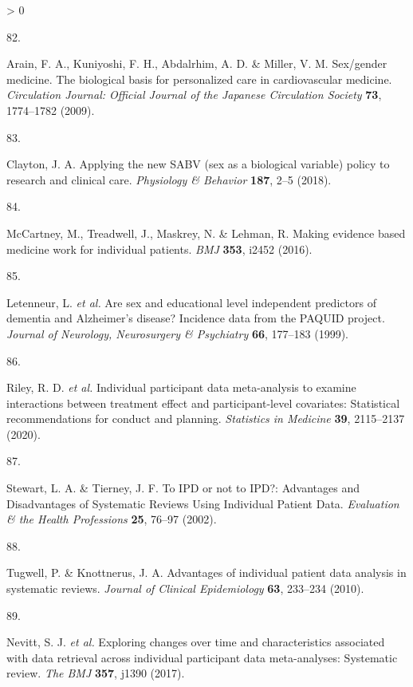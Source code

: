 \documentclass[a4paper, twoside]{templates/ociamthesis}
\newlength{\cslhangindent}
\newlength{\csllabelwidth}
\newenvironment{CSLReferences}[3] %
 {%
  \setlength{\parindent}{0pt}
  \ifodd #1 \everypar{\setlength{\hangindent}{\cslhangindent}}\ignorespaces\fi
  \ifnum #2 > 0
  \setlength{\parskip}{#2\baselineskip}
  \fi
 }%
 {}
\newcommand{\CSLLeftMargin}[1]{\parbox[t]{\maxof{\widthof{#1}}{\csllabelwidth}}{#1}}
\newcommand{\CSLRightInline}[1]{\parbox[t]{\linewidth - \csllabelwidth}{#1}}
\begin{document}
\begin{CSLReferences}{0}{0}
\leavevmode\hypertarget{ref-arain2009}{}%
\CSLLeftMargin{82. }
\CSLRightInline{Arain, F. A., Kuniyoshi, F. H., Abdalrhim, A. D. \& Miller, V. M. Sex/gender medicine. {The} biological basis for personalized care in cardiovascular medicine. \emph{Circulation Journal: Official Journal of the Japanese Circulation Society} \textbf{73}, 1774--1782 (2009).}

\leavevmode\hypertarget{ref-clayton2018}{}%
\CSLLeftMargin{83. }
\CSLRightInline{Clayton, J. A. Applying the new {SABV} (sex as a biological variable) policy to research and clinical care. \emph{Physiology \& Behavior} \textbf{187}, 2--5 (2018).}

\leavevmode\hypertarget{ref-mccartney2016}{}%
\CSLLeftMargin{84. }
\CSLRightInline{McCartney, M., Treadwell, J., Maskrey, N. \& Lehman, R. Making evidence based medicine work for individual patients. \emph{BMJ} \textbf{353}, i2452 (2016).}

\leavevmode\hypertarget{ref-letenneur1999}{}%
\CSLLeftMargin{85. }
\CSLRightInline{Letenneur, L. \emph{et al.} Are sex and educational level independent predictors of dementia and {Alzheimer}'s disease? {Incidence} data from the {PAQUID} project. \emph{Journal of Neurology, Neurosurgery \& Psychiatry} \textbf{66}, 177--183 (1999).}

\leavevmode\hypertarget{ref-riley2020}{}%
\CSLLeftMargin{86. }
\CSLRightInline{Riley, R. D. \emph{et al.} Individual participant data meta-analysis to examine interactions between treatment effect and participant-level covariates: {Statistical} recommendations for conduct and planning. \emph{Statistics in Medicine} \textbf{39}, 2115--2137 (2020).}

\leavevmode\hypertarget{ref-stewart2002}{}%
\CSLLeftMargin{87. }
\CSLRightInline{Stewart, L. A. \& Tierney, J. F. To {IPD} or not to {IPD}?: {Advantages} and {Disadvantages} of {Systematic Reviews Using Individual Patient Data}. \emph{Evaluation \& the Health Professions} \textbf{25}, 76--97 (2002).}

\leavevmode\hypertarget{ref-tugwell2010}{}%
\CSLLeftMargin{88. }
\CSLRightInline{Tugwell, P. \& Knottnerus, J. A. Advantages of individual patient data analysis in systematic reviews. \emph{Journal of Clinical Epidemiology} \textbf{63}, 233--234 (2010).}

\leavevmode\hypertarget{ref-nevitt2017a}{}%
\CSLLeftMargin{89. }
\CSLRightInline{Nevitt, S. J. \emph{et al.} Exploring changes over time and characteristics associated with data retrieval across individual participant data meta-analyses: Systematic review. \emph{The BMJ} \textbf{357}, j1390 (2017).}


\end{CSLReferences}
\end{document}

